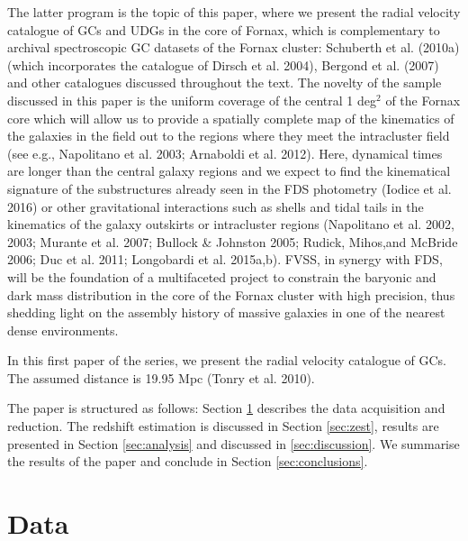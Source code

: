 \documentclass[useAMS,usenatbib]{mn2e}
\begin{document}
The latter program is the topic of this paper, where we present the radial velocity catalogue of GCs and UDGs in the core of Fornax, which is complementary to archival spectroscopic GC datasets of the Fornax cluster: Schuberth et al. (2010a) (which incorporates the catalogue of Dirsch et al. 2004), Bergond et al. (2007) and other catalogues discussed throughout the text. The novelty of the sample discussed in this paper is the uniform coverage of the central 1 deg$^2$ of the Fornax core which will allow us to provide a spatially complete map of the kinematics of the galaxies in the field out to the regions where they meet the intracluster field (see e.g., Napolitano et al. 2003; Arnaboldi et al. 2012). Here, dynamical times are longer than the central galaxy regions and we expect to find the kinematical signature of the substructures already seen in the FDS photometry (Iodice et al. 2016) or other gravitational interactions such as shells and tidal tails in the kinematics of the galaxy outskirts or intracluster regions (Napolitano et al. 2002, 2003; Murante et al. 2007; Bullock & Johnston 2005; Rudick, Mihos,and McBride 2006; Duc et al. 2011; Longobardi et al. 2015a,b). FVSS, in synergy with FDS, will be the foundation of a multifaceted project to constrain the baryonic and dark mass distribution in the core of the Fornax cluster with high precision, thus shedding light on the assembly history of massive galaxies in one of the nearest dense environments.

In this first paper of the series, we present the radial velocity catalogue of GCs. 
The assumed distance is 19.95 Mpc (Tonry et al. 2010).

The paper is structured as follows: Section \ref{sec:data} describes the data acquisition and reduction. The redshift estimation is discussed in Section \ref{sec:zest}, results are presented in Section \ref{sec:analysis} and discussed in \ref{sec:discussion}. We summarise the results of the paper and conclude in Section \ref{sec:conclusions}. 

\section{Data}
\label{sec:data}
\end{document}
